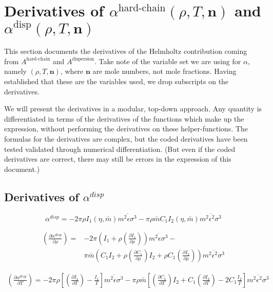 \documentclass[english]{../thermomemo/thermomemo}
\newcommand{\mbf}[0]{\mathbf}
\newcommand*{\pder}[2]{\left(\frac{\partial #1}{\partial #2}\right)}
\newcommand{\lp}{\left(}
\newcommand{\rp}{\right)}
\begin{document}
\section{Derivatives of $\alpha^{\text{hard-chain}} (\rho,T,\mbf n)$ and $\alpha^{\text{disp}} (\rho,T,\mbf n)$}
This section documents the derivatives of the Helmholtz contribution coming from
$A^{\text{hard-chain}}$ and $A^{\text{dispersion}}$. Take note of the variable
set we are using for $\alpha$, namely $(\rho,T,\mbf n)$, where $\mbf n$ are mole
numbers, not mole fractions. Having established that these are the variables
used, we drop subscripts on the
derivatives. %

We will present the derivatives in a modular, top-down approach. Any quantity is
differentiated in terms of the derivatives of the functions which make up the
expression, without performing the derivatives on these helper-functions. The
formulas for the derivatives are complex, but the coded derivatives have been
tested validated through numerical differentiation. (But even if the coded
derivatives are correct, there may still be errors in the expression of this
document.)
\subsection{Derivatives of $\alpha^{disp}$}
\begin{equation}
  \alpha^{disp} = -2 \pi \rho I_1(\eta,\bar m) \overline{m^2 \epsilon \sigma^3} - \pi \rho \bar m C_1 I_2(\eta,\bar m) \overline{m^2 \epsilon^2 \sigma^3}
\end{equation}

\begin{equation}
  \begin{aligned}
    \pder{\alpha^{disp}}{\rho} =& -2 \pi \lp I_1 + \rho \pder{I_1}{\rho} \rp \overline{m^2 \epsilon \sigma^3} - \\
    & \pi \bar m \lp C_1 I_2 + \rho \pder{C_1}{\rho} I_2 + \rho C_1 \pder{I_2}{\rho} \rp \overline{m^2 \epsilon^2 \sigma^3}
  \end{aligned}
\end{equation}

\begin{equation}
  \begin{aligned} %
    \pder{\alpha^{disp}}{T} = -2 \pi \rho \left[ \pder{I_1}{T} - \frac{I_1}{T} \right] \overline{m^2 \epsilon \sigma^3} - 
    \pi \rho \bar m \left[ \pder{C_1}{T} I_2 + C_1 \pder{I_2}{T} - 2 C_1 \frac{I_2}{T}\right] \overline{m^2 \epsilon^2 \sigma^3}
  \end{aligned}
\end{equation}
\end{document}
